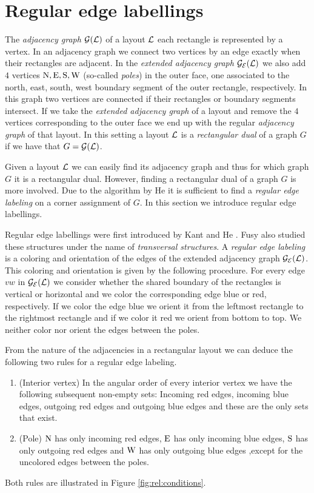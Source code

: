 
\section{Regular edge labellings}
\label{s:rel}
\thispagestyle{plain}
  The \emph{adjacency graph} $\mathcal{G}(\mathcal{L})$ of a layout $\mathcal{L}$ each rectangle is represented by a vertex. In an adjacency graph we connect two vertices by an edge exactly when their rectangles are adjacent.
  In the \emph{extended adjacency graph} $\mathcal{G}_{\mathcal{E}}(\mathcal{L})$ we also add $4$ vertices $\mathrm{N}, \mathrm{E}, \mathrm{S}, \mathrm{W}$ (so-called \emph{poles}) in the outer face, one associated to the north, east, south, west boundary segment of the outer rectangle, respectively.
  In this graph two vertices are connected if their rectangles or boundary segments intersect.
  If we take the \emph{extended adjacency graph} of a layout and remove the $4$ vertices corresponding to the outer face we end up with the regular \emph{adjacency graph} of that layout.
  In this setting a layout $\mathcal{L}$ is a \emph{rectangular dual} of a graph $G$ if we have that $G = \mathcal{G}(\mathcal{L})$.

  Given a layout $\mathcal{L}$ we can easily find its adjacency graph and thus for which graph $G$ it is a rectangular dual. However, finding a rectangular dual of a graph $G$ is more involved. Due to the algorithm by He \cite{He1993} it is sufficient to find a \emph{regular edge labeling} on a corner assignment of $G$. In this section we introduce regular edge labellings.

  Regular edge labellings were first introduced by Kant and He \cite{Kant1997}.
  Fusy also studied these structures \cite{Fusy2009, Fusy2006} under the name of \emph{transversal structures}.
  A \emph{regular edge labeling} is a coloring and orientation of the edges of the extended adjacency graph $\mathcal{G}_{\mathcal{E}}(\mathcal{L})$.
  This coloring and orientation is given by the following procedure.
  For every edge $vw$ in $\mathcal{G}_{\mathcal{E}}(\mathcal{L})$ we consider whether the shared boundary of the rectangles is vertical or horizontal and we color the corresponding edge blue or red, respectively.
  If we color the edge blue we orient it from the leftmost rectangle to the rightmost rectangle and if we color it red we orient from bottom to top.
  We neither color nor orient the edges between the poles.

  From the nature of the adjacencies in a rectangular layout we can deduce the following two rules for a regular edge labeling.
  \begin{enumerate}
    \item (Interior vertex) In the angular order of every interior vertex we have the following subsequent non-empty sets: Incoming red edges, incoming blue edges, outgoing red edges and outgoing blue edges and these are the only sets that exist.
    \item (Pole) $\mathrm{N}$ has only incoming red edges, $\mathrm{E}$ has only incoming blue edges, $\mathrm{S}$ has only outgoing red edges and $\mathrm{W}$ has only outgoing blue edges ,except for the uncolored edges between the poles.
  \end{enumerate}
  Both rules are illustrated in Figure \ref{fig:rel:conditions}.


